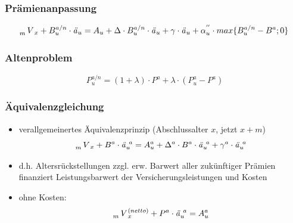 \documentclass[12pt]{report}
\theoremstyle{dotless}
\theoremstyle{definition}
\begin{document}
\subsubsection{Prämienanpassung}
\begin{equation}
	\tensor[_{m}]{V}{}_x + B_u^{a/n} \cdot \text{\textit{ä}}_u = A_u + \Delta \cdot B_u^{a/n} \cdot \text{\textit{ä}}_u + \gamma \cdot \text{\textit{ä}}_u + \alpha _u^{''} \cdot max \{B_u^{a/n}-B^a;0\}
\end{equation}

\subsubsection{Altenproblem}
	\begin{equation}
		P_u^{a/n}=(1+\lambda) \cdot P^a + \lambda \cdot (P_u^a-P^a)
	\end{equation}

\subsubsection{Äquivalenzgleichung}
\begin{itemize}
	\item verallgemeinertes Äquivalenzprinzip (Abschlussalter $x$, jetzt $x+m$)
		\begin{equation}
			\tensor[_m]{V}{}_x + B^a \cdot \text{\textit{ä}}^{\ a}_u = A_u^a + \Delta^a \cdot B^a \cdot \text{\textit{ä}}^{\ a}_u + \gamma^a \cdot \text{\textit{ä}}^{\ a}_u
		\end{equation}
	\item d.h. Altersrückstellungen zzgl. erw. Barwert aller zukünftiger Prämien finanziert Leistungsbarwert der Versicherungsleistungen und Kosten
	\item ohne Kosten: 
		\begin{equation}
			\tensor[_m]{V}{}_x^{(netto)} + P^a \cdot \text{\textit{ä}}^{\ a}_u = A_u^a
		\end{equation}
\end{itemize}
\end{document}
